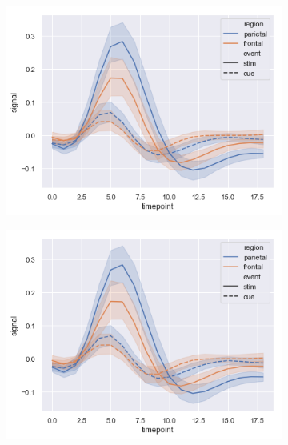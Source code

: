\documentclass[twocolumn]{article}
\begin{document}
\begin{figure}[t]
\centering
\begin{subfigure}[b]{0.32\linewidth}
    \includegraphics[width=\textwidth]{images/errorband_lineplots.png}
    \label{fig:subcaption-subfigure1}
\end{subfigure}
\begin{subfigure}[b]{0.32\linewidth}
    \includegraphics[width=\textwidth]{images/errorband_lineplots.png}
    \label{fig:subcaption-subfigure2}
\end{subfigure}
\begin{subfigure}[b]{0.32\linewidth}

\end{subfigure}
\end{figure}
\end{document}
